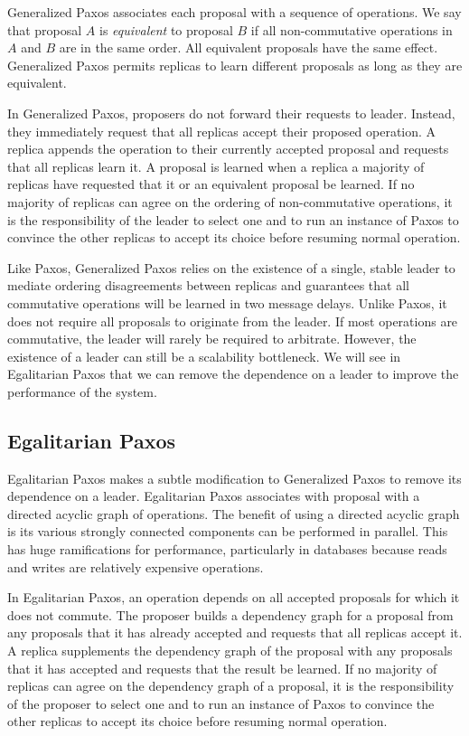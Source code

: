\documentclass[../main.tex]{subfiles}
\begin{document}
  Generalized Paxos associates each proposal with a sequence of operations. We say that proposal $A$
  is \emph{equivalent} to proposal $B$ if all non-commutative operations in $A$ and $B$ are in the
  same order. All equivalent proposals have the same effect. Generalized Paxos permits replicas to
  learn different proposals as long as they are equivalent.

  In Generalized Paxos, proposers do not forward their requests to leader. Instead, they immediately
  request that all replicas accept their proposed operation. A replica appends the operation to
  their currently accepted proposal and requests that all replicas learn it. A proposal is learned
  when a replica a majority of replicas have requested that it or an equivalent proposal be learned.
  If no majority of replicas can agree on the ordering of non-commutative operations, it is the
  responsibility of the leader to select one and to run an instance of Paxos to convince the other
  replicas to accept its choice before resuming normal operation.

  Like Paxos, Generalized Paxos relies on the existence of a single, stable leader to mediate
  ordering disagreements between replicas and guarantees that all commutative operations will be
  learned in two message delays. Unlike Paxos, it does not require all proposals to originate from
  the leader. If most operations are commutative, the leader will rarely be required to arbitrate.
  However, the existence of a leader can still be a scalability bottleneck. We will see in
  Egalitarian Paxos that we can remove the dependence on a leader to improve the performance of the
  system.

  \subsection{Egalitarian Paxos}
  Egalitarian Paxos makes a subtle modification to Generalized Paxos to remove its dependence on a
  leader. Egalitarian Paxos associates with proposal with a directed acyclic graph of operations.
  The benefit of using a directed acyclic graph is its various strongly connected components can be
  performed in parallel. This has huge ramifications for performance, particularly in databases
  because reads and writes are relatively expensive operations. \cite{epaxos}

  In Egalitarian Paxos, an operation depends on all accepted proposals for which it does not
  commute. The proposer builds a dependency graph for a proposal from any proposals that it has
  already accepted and requests that all replicas accept it. A replica supplements the dependency
  graph of the proposal with any proposals that it has accepted and requests that the result be
  learned. If no majority of replicas can agree on the dependency graph of a proposal, it is the
  responsibility of the proposer to select one and to run an instance of Paxos to convince the
  other replicas to accept its choice before resuming normal operation.
\end{document}
